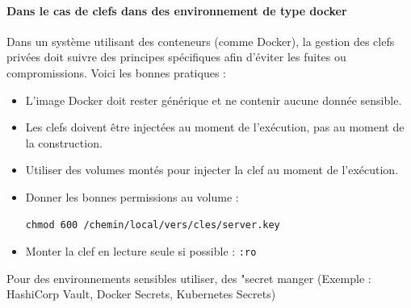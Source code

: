 \documentclass[french, 12pt]{article}%
\newcommand{\itemE}{\item[$\bullet$]}
\begin{document}
\paragraph{Dans le cas de clefs dans des environnement de type docker}

Dans un système utilisant des conteneurs (comme Docker), la gestion des clefs privées doit suivre des principes spécifiques afin d'éviter les fuites ou compromissions. Voici les bonnes pratiques :

\begin{itemize}
        \itemE L’image Docker doit rester générique et ne contenir aucune donnée sensible.
        \itemE Les  clefs doivent être injectées au moment de l'exécution, pas au moment de la construction.
        \itemE Utiliser des volumes montés pour injecter la clef au  moment de l'exécution.
        \itemE Donner les bonnes permissions au volume :
  \begin{lstlisting}[style=commande]
chmod 600 /chemin/local/vers/cles/server.key
\end{lstlisting}
		\itemE Monter la clef en lecture seule si possible : \verb?:ro? 
 \end{itemize}

Pour des environnements sensibles utiliser, des "secret manger (Exemple : HashiCorp Vault, Docker Secrets, Kubernetes Secrets)
\end{document}
